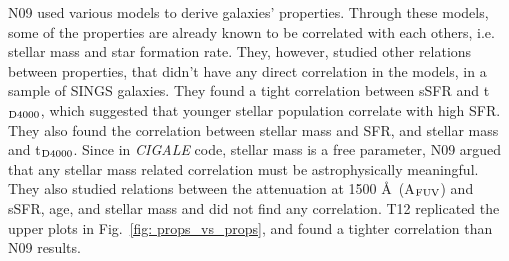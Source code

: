 \documentclass[useAMS,usenatbib]{mn2e}
\begin{document}
        N09 used various models to derive galaxies' properties.
        Through these models, some of the properties are already known to be correlated with each others, i.e. stellar mass and star formation rate.
        They, however, studied other relations between properties, that didn't have any direct correlation in the models, in a sample of SINGS galaxies. %
        They found a tight correlation between sSFR and t$_{\rm {D4000}}$, which suggested that younger stellar population correlate with high SFR.
        They also found the correlation between stellar mass and SFR, and stellar mass and t$_{\rm {D4000}}$.
        Since in {\em CIGALE} code, stellar mass is a free parameter, N09 argued that any stellar mass related correlation must be astrophysically meaningful. 
        They also studied relations between the attenuation at 1500 \AA~(A$_{\rm {FUV}}$) and sSFR, age, and stellar mass and did not find any correlation.
        T12 replicated the upper plots in Fig.~\ref{fig: props_vs_props}, and found a tighter correlation than N09 results. 
        
\end{document}
